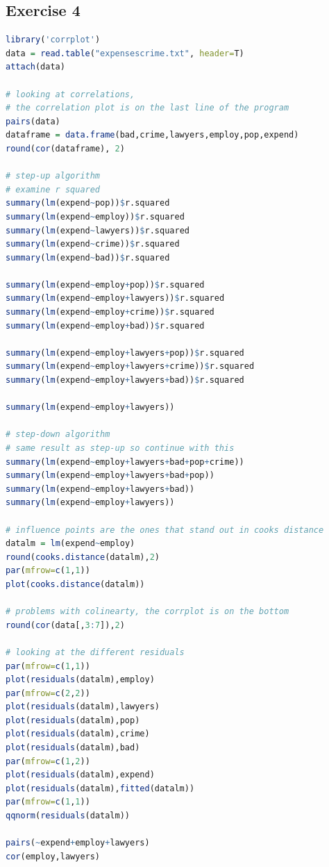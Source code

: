 \documentclass{article}
\begin{document}
    \subsection{Exercise 4}\label{sec:RE4}
      \begin{lstlisting}[language=R]
      library('corrplot')
data = read.table("expensescrime.txt", header=T)
attach(data)

# looking at correlations, 
# the correlation plot is on the last line of the program
pairs(data)
dataframe = data.frame(bad,crime,lawyers,employ,pop,expend)
round(cor(dataframe), 2)

# step-up algorithm
# examine r squared
summary(lm(expend~pop))$r.squared
summary(lm(expend~employ))$r.squared
summary(lm(expend~lawyers))$r.squared
summary(lm(expend~crime))$r.squared
summary(lm(expend~bad))$r.squared

summary(lm(expend~employ+pop))$r.squared
summary(lm(expend~employ+lawyers))$r.squared
summary(lm(expend~employ+crime))$r.squared
summary(lm(expend~employ+bad))$r.squared

summary(lm(expend~employ+lawyers+pop))$r.squared
summary(lm(expend~employ+lawyers+crime))$r.squared
summary(lm(expend~employ+lawyers+bad))$r.squared

summary(lm(expend~employ+lawyers))

# step-down algorithm
# same result as step-up so continue with this
summary(lm(expend~employ+lawyers+bad+pop+crime))
summary(lm(expend~employ+lawyers+bad+pop))
summary(lm(expend~employ+lawyers+bad))
summary(lm(expend~employ+lawyers))

# influence points are the ones that stand out in cooks distance
datalm = lm(expend~employ)
round(cooks.distance(datalm),2)
par(mfrow=c(1,1))
plot(cooks.distance(datalm))

# problems with colinearty, the corrplot is on the bottom
round(cor(data[,3:7]),2)

# looking at the different residuals
par(mfrow=c(1,1))
plot(residuals(datalm),employ)
par(mfrow=c(2,2))
plot(residuals(datalm),lawyers)
plot(residuals(datalm),pop)
plot(residuals(datalm),crime)
plot(residuals(datalm),bad)
par(mfrow=c(1,2))
plot(residuals(datalm),expend)
plot(residuals(datalm),fitted(datalm))
par(mfrow=c(1,1))
qqnorm(residuals(datalm))

pairs(~expend+employ+lawyers)
cor(employ,lawyers)
      \end{lstlisting}
\end{document}
